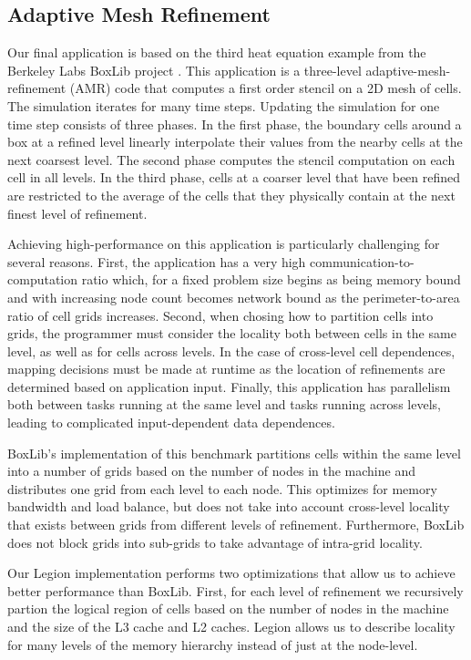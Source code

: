 \subsection{Adaptive Mesh Refinement}
\label{subsec:exp_amr}
Our final application is based on the third heat equation example from the Berkeley Labs 
BoxLib project \cite{BoxLib}.  This application is a three-level adaptive-mesh-refinement (AMR)
code that computes a first order stencil on a 2D mesh of cells.  The simulation iterates for many time
steps.  Updating the simulation for one time step consists of three phases.  In the first phase,
the boundary cells around a box at a refined level linearly interpolate their values from the nearby cells at the
next coarsest level.  The second phase computes the stencil computation on each cell in all levels.
In the third phase, cells at a coarser level that have been refined are restricted to the average
of the cells that they physically contain at the next finest level of refinement.

Achieving high-performance on this application is particularly challenging for several reasons.  
First, the application has a very high communication-to-computation ratio which, for a fixed problem
size begins as being memory bound and with increasing node count becomes network bound as the
perimeter-to-area ratio of cell grids increases.  Second, when chosing how to partition cells into grids, the
programmer must consider the locality both between cells in the same level, as well as for cells
across levels.  In the case of cross-level cell dependences, mapping decisions must be made at runtime as the
location of refinements are determined based on application input.  Finally, this application has
parallelism both between tasks running at the same level and tasks running across levels, leading
to complicated input-dependent data dependences.

BoxLib's implementation of this benchmark partitions cells within the same level into a number of grids
based on the number of nodes in the machine and distributes one grid from each level to each node.  This
optimizes for memory bandwidth and load balance, but does not take into account cross-level locality 
that exists between grids from different levels of refinement.  Furthermore, BoxLib does not block grids
into sub-grids to take advantage of intra-grid locality.

Our Legion implementation performs two optimizations that allow us to achieve better performance than BoxLib.
First, for each level of refinement we recursively partion the logical region of cells based on 
the number of nodes in the machine and the size of the L3 cache and L2 caches.  Legion allows us to describe 
locality for many levels of the memory hierarchy instead of just at the node-level.

